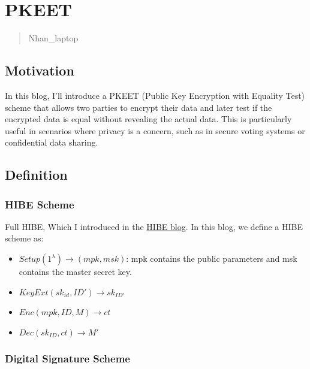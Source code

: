 \documentclass[
]{article}
\author{}
\date{}
\begin{document}
\hypertarget{pkeet}{%
\section{PKEET}\label{pkeet}}

\begin{quote}
Nhan\_laptop
\end{quote}

\hypertarget{motivation}{%
\subsection{Motivation}\label{motivation}}

In this blog, I'll introduce a PKEET (Public Key Encryption with
Equality Test) scheme that allows two parties to encrypt their data and
later test if the encrypted data is equal without revealing the actual
data. This is particularly useful in scenarios where privacy is a
concern, such as in secure voting systems or confidential data sharing.

\hypertarget{definition}{%
\subsection{Definition}\label{definition}}

\hypertarget{hibe-scheme}{%
\subsubsection{HIBE Scheme}\label{hibe-scheme}}

Full HIBE, Which I introduced in the \href{../IBE-HIBE/IBE-HIBE.md}{HIBE
blog}. In this blog, we define a HIBE scheme as:

\begin{itemize}
\item
  \(Setup(1^\lambda) \rightarrow (mpk, msk)\): mpk contains the public
  parameters and msk contains the master secret key.
\item
  \(KeyExt({sk}_{id},ID') \rightarrow {sk}_{ID'}\)
\item
  \(Enc(mpk,ID,M) \rightarrow ct\)
\item
  \(Dec({sk}_{ID}, ct) \rightarrow M'\)
\end{itemize}

\hypertarget{digital-signature-scheme}{%
\subsubsection{Digital Signature
Scheme}\label{digital-signature-scheme}}
\end{document}
